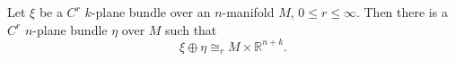 Let $\xi$ be a $C^r$ $k$-plane bundle over an $n$-manifold $M$, $0 \leqslant r \leqslant \infty$. Then there is a $C^r$ $n$-plane bundle $\eta$ over $M$ such that
$$\xi \oplus \eta \cong_r M \times \mathbb{R}^{n+k}.$$
